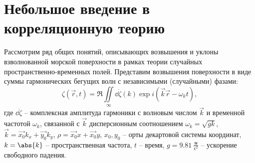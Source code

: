 



\section{Небольшое введение в корреляционную теорию}
Рассмотрим ряд общих понятий, описывающих возвышения и уклоны взволнованной морской поверхности в рамках теории случайных пространственно-временных полей. Представим возвышения поверхности в виде суммы гармонических бегущих волн с независимыми (случайными) фазами:
\begin{equation}
	\label{eq:1}
	\zeta(\vec r, t)=\Re \iint\limits_{\infty} \dd{\dot \zeta(k)} \exp{i(\vec k \vec r - \omega_k t)}, 
\end{equation}
где $\dd{\dot \zeta}$ -- комплексная амплитуда гармоники с волновым числом $\vec k$  и временной частотой $\omega_k$, связанной с $\vec k$ дисперсионным соотношением $\omega_k=\sqrt{g k }$, $\vec{k}=\vec{x_0} k_x + \vec{y_0} k_y$, $\rho=\vec{x_0} x + \vec{x_0} y$,
$x_0,y_0$ -- орты декартовой системы координат, $k=\abs{k}$ -- пространственная частота, $t$ -- время, $g=9.81 ~ \frac{\text{м}}{\text{с}^2}$ -- ускорение свободного падения.


